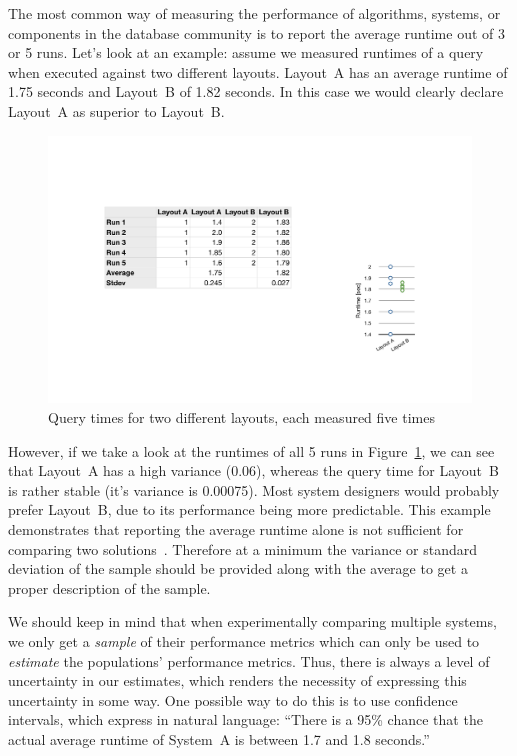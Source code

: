 \documentclass{sig-alternate}
\begin{document}
The most common way of measuring the performance of algorithms, systems, or components in the database community is to report the average runtime out of 3 or 5 runs. Let's look at an example: assume we measured runtimes of a query when executed against two different layouts. Layout~A has an average runtime of 1.75 seconds and Layout~B of 1.82 seconds. In this case we would clearly declare Layout~A as superior to Layout~B.
\begin{figure}
\vspace*{-15pt}
\hspace*{-8pt}
\includegraphics[width=.18\textwidth]{pdf/methodology_runtimes.pdf}
\vspace{-15pt}
\caption{Query times for two different layouts, each measured five times}  
\label{fig:methodology_runtimes}
\vspace{-10pt}
\end{figure}
However, if we take a look at the runtimes of all 5 runs in Figure~\ref{fig:methodology_runtimes}, we can see that Layout~A has a high variance (0.06), whereas the query time for Layout~B is rather stable (it's variance is 0.00075). Most system designers would probably prefer Layout~B, due to its performance being more predictable. This example demonstrates that reporting the average runtime alone is not sufficient for comparing two solutions~\cite{jain1991art}. Therefore at a minimum the variance or standard deviation of the sample should be provided along with the average to get a proper description of the sample.

We should keep in mind that when experimentally comparing multiple systems, we only get a \textit{sample} of their performance metrics which can only be used to \textit{estimate} the populations' performance metrics. Thus, there is always a level of uncertainty in our estimates, which renders the necessity of expressing this uncertainty in some way. One possible way to do this is to use confidence intervals, which express in natural language: ``There is a 95\% chance that the actual average runtime of System~A is between 1.7 and 1.8 seconds.''
\end{document}
